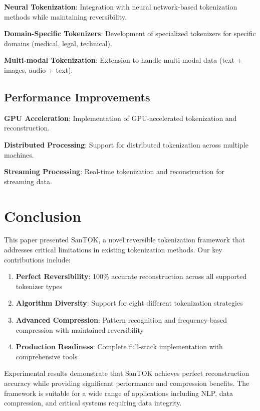 \documentclass[conference]{IEEEtran}
\begin{document}
\textbf{Neural Tokenization}: Integration with neural network-based tokenization methods while maintaining reversibility.

\textbf{Domain-Specific Tokenizers}: Development of specialized tokenizers for specific domains (medical, legal, technical).

\textbf{Multi-modal Tokenization}: Extension to handle multi-modal data (text + images, audio + text).

\subsection{Performance Improvements}

\textbf{GPU Acceleration}: Implementation of GPU-accelerated tokenization and reconstruction.

\textbf{Distributed Processing}: Support for distributed tokenization across multiple machines.

\textbf{Streaming Processing}: Real-time tokenization and reconstruction for streaming data.

\section{Conclusion}

This paper presented SanTOK, a novel reversible tokenization framework that addresses critical limitations in existing tokenization methods. Our key contributions include:

\begin{enumerate}
    \item \textbf{Perfect Reversibility}: 100\% accurate reconstruction across all supported tokenizer types
    \item \textbf{Algorithm Diversity}: Support for eight different tokenization strategies
    \item \textbf{Advanced Compression}: Pattern recognition and frequency-based compression with maintained reversibility
    \item \textbf{Production Readiness}: Complete full-stack implementation with comprehensive tools
\end{enumerate}

Experimental results demonstrate that SanTOK achieves perfect reconstruction accuracy while providing significant performance and compression benefits. The framework is suitable for a wide range of applications including NLP, data compression, and critical systems requiring data integrity.
\end{document}
